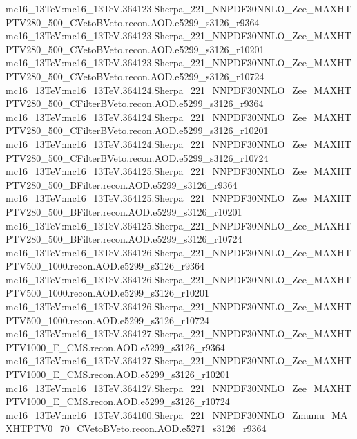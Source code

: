 { mc16\_13TeV:mc16\_13TeV.364123.Sherpa\_221\_NNPDF30NNLO\_Zee\_MAXHTPTV280\_500\_CVetoBVeto.recon.AOD.e5299\_s3126\_r9364  \newline   
 mc16\_13TeV:mc16\_13TeV.364123.Sherpa\_221\_NNPDF30NNLO\_Zee\_MAXHTPTV280\_500\_CVetoBVeto.recon.AOD.e5299\_s3126\_r10201   \newline  
 mc16\_13TeV:mc16\_13TeV.364123.Sherpa\_221\_NNPDF30NNLO\_Zee\_MAXHTPTV280\_500\_CVetoBVeto.recon.AOD.e5299\_s3126\_r10724 \newline    
 mc16\_13TeV:mc16\_13TeV.364124.Sherpa\_221\_NNPDF30NNLO\_Zee\_MAXHTPTV280\_500\_CFilterBVeto.recon.AOD.e5299\_s3126\_r9364 \newline   
 mc16\_13TeV:mc16\_13TeV.364124.Sherpa\_221\_NNPDF30NNLO\_Zee\_MAXHTPTV280\_500\_CFilterBVeto.recon.AOD.e5299\_s3126\_r10201   \newline  
 mc16\_13TeV:mc16\_13TeV.364124.Sherpa\_221\_NNPDF30NNLO\_Zee\_MAXHTPTV280\_500\_CFilterBVeto.recon.AOD.e5299\_s3126\_r10724 \newline    
 mc16\_13TeV:mc16\_13TeV.364125.Sherpa\_221\_NNPDF30NNLO\_Zee\_MAXHTPTV280\_500\_BFilter.recon.AOD.e5299\_s3126\_r9364  \newline   
 mc16\_13TeV:mc16\_13TeV.364125.Sherpa\_221\_NNPDF30NNLO\_Zee\_MAXHTPTV280\_500\_BFilter.recon.AOD.e5299\_s3126\_r10201 \newline    
 mc16\_13TeV:mc16\_13TeV.364125.Sherpa\_221\_NNPDF30NNLO\_Zee\_MAXHTPTV280\_500\_BFilter.recon.AOD.e5299\_s3126\_r10724  \newline   
 mc16\_13TeV:mc16\_13TeV.364126.Sherpa\_221\_NNPDF30NNLO\_Zee\_MAXHTPTV500\_1000.recon.AOD.e5299\_s3126\_r9364 \newline     
 mc16\_13TeV:mc16\_13TeV.364126.Sherpa\_221\_NNPDF30NNLO\_Zee\_MAXHTPTV500\_1000.recon.AOD.e5299\_s3126\_r10201 \newline    
 mc16\_13TeV:mc16\_13TeV.364126.Sherpa\_221\_NNPDF30NNLO\_Zee\_MAXHTPTV500\_1000.recon.AOD.e5299\_s3126\_r10724   \newline  
 mc16\_13TeV:mc16\_13TeV.364127.Sherpa\_221\_NNPDF30NNLO\_Zee\_MAXHTPTV1000\_E\_CMS.recon.AOD.e5299\_s3126\_r9364  \newline   
 mc16\_13TeV:mc16\_13TeV.364127.Sherpa\_221\_NNPDF30NNLO\_Zee\_MAXHTPTV1000\_E\_CMS.recon.AOD.e5299\_s3126\_r10201 \newline    
 mc16\_13TeV:mc16\_13TeV.364127.Sherpa\_221\_NNPDF30NNLO\_Zee\_MAXHTPTV1000\_E\_CMS.recon.AOD.e5299\_s3126\_r10724 \newline    
 mc16\_13TeV:mc16\_13TeV.364100.Sherpa\_221\_NNPDF30NNLO\_Zmumu\_MAXHTPTV0\_70\_CVetoBVeto.recon.AOD.e5271\_s3126\_r9364 \newline    
}
